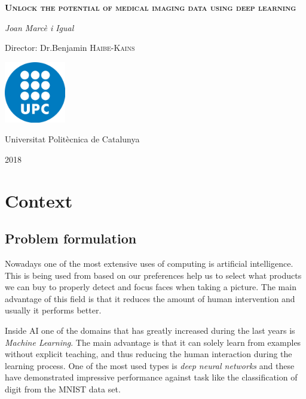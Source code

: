 \documentclass[a4paper]{article}
\begin{document}
\begin{titlepage}
    \centering
	\vspace{1.5cm}
	{\huge \textbf{\textsc{Unlock the potential of medical imaging data using deep learning}} \par}
	\vspace{2cm}
	{\Large \textit{Joan Marcè i Igual}\par}
	\vfill
    Director: Dr.Benjamin \textsc{Haibe-Kains}
    
    \vfill

    \includegraphics[width=0.2\textwidth]{images/logo_upc}\par\vspace{1cm}
	\vfill
    
    {\LARGE Universitat Politècnica de Catalunya \par}
    {\LARGE 2018 \par}
\end{titlepage}

\tableofcontents

\section{Context}

\subsection{Problem formulation}

Nowadays one of the most extensive uses of computing is artificial intelligence. This is being
used from based on our preferences help us to select what products we can buy to properly detect
and focus faces when taking a picture. The main advantage of this field is that it reduces the
amount of human intervention and usually it performs better.

Inside AI one of the domains that has greatly increased during the last years is 
\emph{Machine Learning}. The main advantage is that it can solely learn from examples without 
explicit teaching, and thus reducing the human interaction during the learning process. One of the 
most used types is \emph{deep neural networks} and these have demonstrated impressive performance 
against task like the classification of digit from the MNIST data set.
~\cites{MNIST}{empirical-evaluation-deep-architectures}
\end{document}
